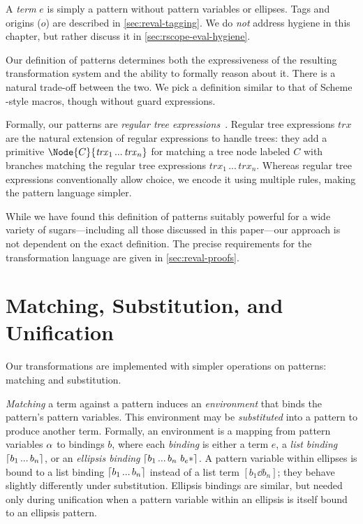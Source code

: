 A \emph{term} $e$ is simply a pattern without pattern variables or
ellipses. Tags and origins ($o$) are described in \cref{sec:reval-tagging}.
We do \emph{not} address hygiene in this chapter, but rather discuss
it in \cref{sec:rscope-eval-hygiene}.

Our definition of patterns determines both the expressiveness of the
resulting transformation system and the ability to formally reason about
it. There is a natural trade-off between the two. We pick a definition similar to
that of Scheme -style macros, though without guard
expressions.

Formally, our patterns are \emph{regular tree
  expressions}~\cite{regular-tree-expressions}. Regular tree
expressions $\mathit{trx}$ are the natural extension of regular
expressions to handle trees: they add a primitive $\Node{C}{\mathit{trx}_1
\,...\,\mathit{trx}_n}$ for matching a tree node labeled $C$ with
branches matching the regular tree expressions
$\mathit{trx}_1\,...\,\mathit{trx}_n$. Whereas regular tree
expressions conventionally allow choice, we encode it using multiple
rules, making the pattern language simpler.

While we have found this definition of patterns suitably powerful for a
wide variety of sugars---including all those discussed in this paper---our
approach is not dependent on the exact definition. The precise
requirements for the transformation language are given in
\cref{sec:reval-proofs}.



\section{Matching, Substitution, and Unification}

Our transformations are implemented with simpler operations on patterns:
matching and substitution.

\emph{Matching} a term against a pattern induces an \emph{environment}
that binds the pattern's pattern variables. This environment may be
\emph{substituted} into a pattern to produce another term. Formally, an
environment is a mapping from pattern variables $\alpha$ to bindings $b$,
where each \emph{binding} is either a term $e$, a \emph{list binding}
$\lceil b_1 \,...\, b_n \rceil$, or an \emph{ellipsis binding}
$\lceil b_1 \,...\, b_n\ b_e* \rceil$. A pattern variable within ellipses is
bound to a list binding $\lceil b_1 \,...\, b_n \rceil$ instead of a list term
$[b_1 \dd b_n]$; they behave slightly differently under
substitution. Ellipsis bindings are similar, but needed only during
unification when a pattern variable within an ellipsis is itself bound to an
ellipsis pattern.

